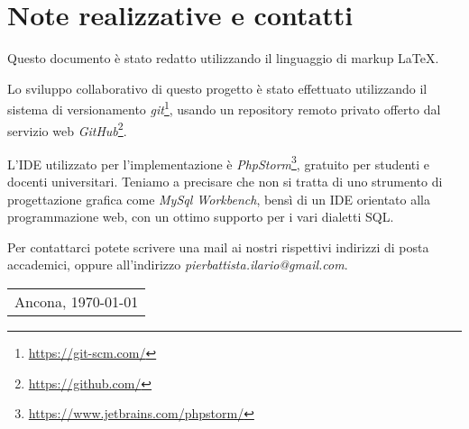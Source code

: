 \section{Note realizzative e contatti}

	Questo documento è stato redatto utilizzando il linguaggio di markup \LaTeX.

	Lo sviluppo collaborativo di questo progetto è stato effettuato utilizzando il sistema di versionamento \emph{git}\footnote{\url{https://git-scm.com/}}, usando un repository remoto privato offerto dal servizio web \emph{GitHub}\footnote{\url{https://github.com/}}.

	L'IDE utilizzato per l'implementazione è \emph{PhpStorm}\footnote{\url{https://www.jetbrains.com/phpstorm/}}, gratuito per studenti e docenti universitari. Teniamo a precisare che non si tratta di uno strumento di progettazione grafica come \emph{MySql Workbench}, bensì di un IDE orientato alla programmazione web, con un ottimo supporto per i vari dialetti SQL.

	Per contattarci potete scrivere una mail ai nostri rispettivi indirizzi di posta accademici, oppure all'indirizzo \emph{pierbattista.ilario@gmail.com}.

	\vfill
	\hfill
	\begin{tabular}[r]{p{5cm}}
		Ancona, \today
	\end{tabular}